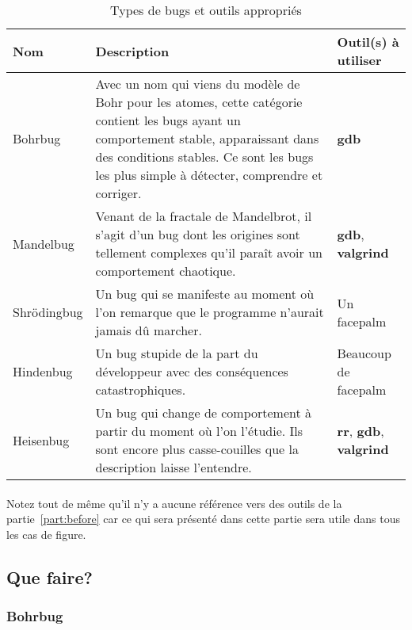\begin{table}[H]
	\centering
	\begin{tabular}{lp{20em}p{9em}}
		\toprule
		\textbf{Nom} & \textbf{Description} & \textbf{Outil(s) à utiliser}\\
		\midrule
		Bohrbug & Avec un nom qui viens du modèle de Bohr pour les atomes,
			cette catégorie contient les bugs ayant un comportement stable,
			apparaissant dans des conditions stables. Ce sont les bugs les plus
			simple à détecter, comprendre et corriger. & \textbf{gdb}\\
		Mandelbug & Venant de la fractale de Mandelbrot, il s'agit d'un bug
			dont les origines sont tellement complexes qu'il paraît avoir un
			comportement chaotique. & \textbf{gdb}, \textbf{valgrind}\\
		Shrödingbug & Un bug qui se manifeste au moment où l'on remarque que
			le programme n'aurait jamais dû marcher. & Un facepalm\\
		Hindenbug & Un bug stupide de la part du développeur avec des
			conséquences catastrophiques. & Beaucoup de facepalm\\
		Heisenbug & Un bug qui change de comportement à partir du moment où
			l'on l'étudie. Ils sont encore plus casse-couilles que la
			description laisse l'entendre. & \textbf{rr}, \textbf{gdb},
			\textbf{valgrind} \\
		\bottomrule
	\end{tabular}%
	\label{tab:bugtypes}
	\caption{Types de bugs et outils appropriés}
\end{table}

\paragraph{} Notez tout de même qu'il n'y a aucune référence vers des outils de
la partie~\ref{part:before} car ce qui sera présenté dans cette partie sera
utile dans tous les cas de figure.

\subsection{Que faire?}

\subsubsection{Bohrbug}

